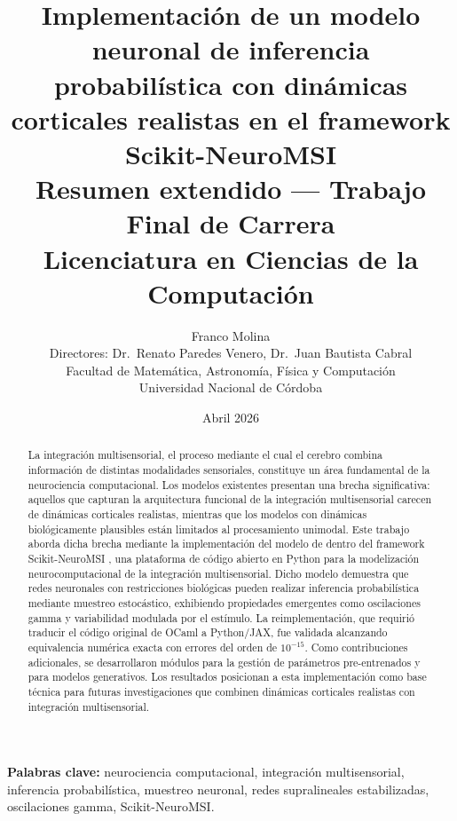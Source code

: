 \documentclass[spanish,a4paper,11pt]{article}
\title{\textbf{Implementación de un modelo neuronal de inferencia probabilística con dinámicas corticales realistas en el framework Scikit-NeuroMSI}\\[0.5cm]
\large Resumen extendido --- Trabajo Final de Carrera\\
Licenciatura en Ciencias de la Computación}
\author{Franco Molina\\[0.3cm]
\small Directores: Dr.\ Renato Paredes Venero, Dr.\ Juan Bautista Cabral\\
\small Facultad de Matemática, Astronomía, Física y Computación\\
\small Universidad Nacional de Córdoba}
\date{Abril 2026}
\begin{document}
\maketitle
\thispagestyle{fancy}


\begin{abstract}
La integración multisensorial, el proceso mediante el cual el cerebro combina información de distintas modalidades sensoriales, constituye un área fundamental de la neurociencia computacional. Los modelos existentes presentan una brecha significativa: aquellos que capturan la arquitectura funcional de la integración multisensorial carecen de dinámicas corticales realistas, mientras que los modelos con dinámicas biológicamente plausibles están limitados al procesamiento unimodal. Este trabajo aborda dicha brecha mediante la implementación del modelo de \citet{echeveste2020cortical} dentro del framework Scikit-NeuroMSI \citep{paredes2025scikit}, una plataforma de código abierto en Python para la modelización neurocomputacional de la integración multisensorial. Dicho modelo demuestra que redes neuronales con restricciones biológicas pueden realizar inferencia probabilística mediante muestreo estocástico, exhibiendo propiedades emergentes como oscilaciones gamma y variabilidad modulada por el estímulo. La reimplementación, que requirió traducir el código original de OCaml a Python/JAX, fue validada alcanzando equivalencia numérica exacta con errores del orden de $10^{-15}$. Como contribuciones adicionales, se desarrollaron módulos para la gestión de parámetros pre-entrenados y para modelos generativos. Los resultados posicionan a esta implementación como base técnica para futuras investigaciones que combinen dinámicas corticales realistas con integración multisensorial.
\end{abstract}

\vspace{0.5cm}
\noindent\textbf{Palabras clave:} neurociencia computacional, integración multisensorial, inferencia probabilística, muestreo neuronal, redes supralineales estabilizadas, oscilaciones gamma, Scikit-NeuroMSI.

\end{document}

